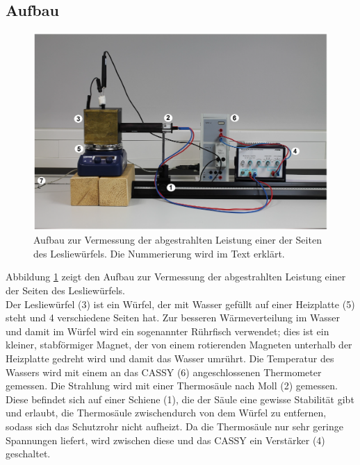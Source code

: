 \documentclass[12pt,a4paper]{article}
\begin{document}
\subsection{Aufbau}
\begin{figure}
\centering
\includegraphics[scale=0.6]{Bilder/Aufbau.png}
\caption{Aufbau zur Vermessung der abgestrahlten Leistung einer der Seiten des Lesliewürfels. Die Nummerierung wird im Text erklärt.}
\label{fig:Aufbau}
\end{figure}

Abbildung \ref{fig:Aufbau} zeigt den Aufbau zur Vermessung der abgestrahlten Leistung einer der Seiten des Lesliewürfels.\\
Der Lesliewürfel (3) ist ein Würfel, der mit Wasser gefüllt auf einer Heizplatte (5) steht und 4 verschiedene Seiten hat. Zur besseren Wärmeverteilung im Wasser und damit im Würfel wird ein sogenannter Rührfisch verwendet; dies ist ein kleiner, stabförmiger Magnet, der von einem rotierenden Magneten unterhalb der Heizplatte gedreht wird und damit das Wasser umrührt. Die Temperatur des Wassers wird mit einem an das CASSY (6) angeschlossenen Thermometer gemessen. Die Strahlung wird mit einer Thermosäule nach Moll (2) gemessen. Diese befindet sich auf einer Schiene (1), die der Säule eine gewisse Stabilität gibt und erlaubt, die Thermosäule zwischendurch von dem Würfel zu entfernen, sodass sich das Schutzrohr nicht aufheizt. Da die Thermosäule nur sehr geringe Spannungen liefert, wird zwischen diese und das CASSY ein Verstärker (4) geschaltet.
\end{document}
